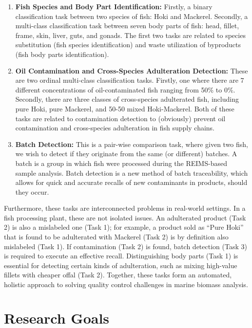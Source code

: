 \begin{enumerate}
\item \textbf{Fish Species and Body Part Identification:} Firstly, a binary classification task between two species of fish:
Hoki and Mackerel.
Secondly, a multi-class classification task between seven body parts of fish: head, fillet, frame, skin, liver, guts, and gonads. The first two tasks are related to species substitution (fish species identification) and waste utilization of byproducts (fish body parts identification).
\item \textbf{Oil Contamination and Cross-Species Adulteration Detection:} These are two ordinal multi-class classification tasks. Firstly, one where there are 7 different concentrations of oil-contaminated fish ranging from 50\% to 0\%. Secondly, there are three classes of cross-species adulterated fish, including pure Hoki, pure Mackerel, and 50-50 mixed Hoki-Mackerel. Both of these tasks are related to contamination detection to (obviously) prevent oil contamination and cross-species adulteration in fish supply chains.
\item \textbf{Batch Detection:} This is a pair-wise comparison task, where given two fish, we wish to detect if they originate from the same (or different) batches. A batch is a group in which fish were processed during the REIMS-based sample analysis. Batch detection is a new method of batch traceability, which allows for quick and accurate recalls of new contaminants in products, should they occur.
\end{enumerate}

Furthermore, these tasks are interconnected problems in real-world settings. In a fish processing plant, these are not isolated issues.
An adulterated product (Task 2) is also a mislabeled one (Task 1); for example, a product sold as ``Pure Hoki'' that is found to be adulterated with Mackerel (Task 2) is by definition also mislabeled (Task 1).
If contamination (Task 2) is found, batch detection (Task 3) is required to execute an effective recall. Distinguishing body parts (Task 1) is essential for detecting certain kinds of adulteration, such as mixing high-value fillets with cheaper offal (Task 2). Together, these tasks form an automated, holistic approach to solving quality control challenges in marine biomass analysis.

\section{Research Goals}

